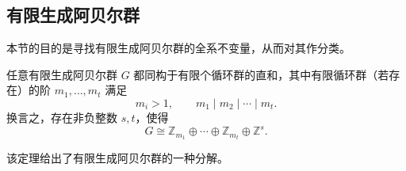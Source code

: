\subsection{有限生成阿贝尔群}\label{sec:finitely-generated-abelian-groups}


\begin{purplenote}
本节的目的是寻找有限生成阿贝尔群的全系不变量，从而对其作分类。
\end{purplenote}

\begin{theorem}\label{thm:fg-abelian-invariant-factor-existence}
任意有限生成阿贝尔群 $G$ 都同构于有限个循环群的直和，其中有限循环群（若存在）的阶 $m_1,\ldots,m_t$ 满足
\[
  m_i>1,\qquad m_1\mid m_2\mid\cdots\mid m_t.
\]
换言之，存在非负整数 $s,t$，使得
\[
  G\cong\mathbb Z_{m_1}\oplus\cdots\oplus\mathbb Z_{m_t}
       \oplus\mathbb Z^s.
\]
\end{theorem}

\begin{purplenote}
该定理给出了有限生成阿贝尔群的一种分解。
\end{purplenote}

